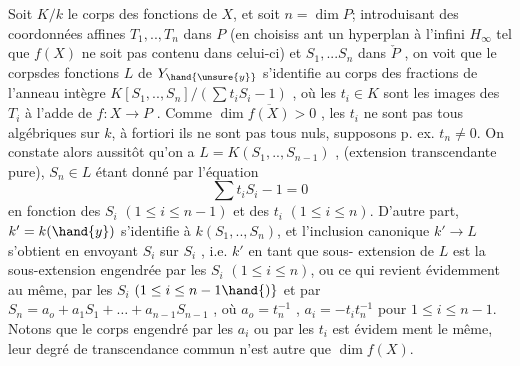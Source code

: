 
 Soit $K/k$ le corps des fonctions de $X$, et soit $n=\dim P$;
introduisant des coordonnées  affines $T_1,..,T_n$ dans $P$ (en choisiss
ant un hyperplan à l'infini $H_\infty$ tel que $f(X)$ ne soit pas contenu dans
celui-ci) et $S_1,...S_n$ dans $\check{P}$ , on voit que le corpsdes fonctions $L$
de $Y_{\hand{\unsure{y}}}$  s'identifie au corps des fractions de l'anneau intègre
$K[S_1,..,S_n]/(\sum t_iS_i - 1)$ , où les $t_i \in K$ sont les images des $T_i$ à
l'adde de $f:X\to P$ . Comme $\dim \overline{f(X)} > 0$ , les $t_i$ ne sont pas tous
algébriques sur $k$, à fortiori ils ne sont pas tous nuls, supposons
p. ex. $t_n \neq 0$. On constate alors aussitôt qu'on a $L = K(S_1,..,S_{n-1})$ ,
(extension transcendante pure), $S_n\in L$ étant donné par l'équation
\[ \sum t_iS_i - 1 = 0 \]
en fonction des $S_i$ $(1\leq i\leq n-1)$ et des $t_i$ $(1\leq i\leq n)$. D'autre part,
$k' = k(\hand{y})$ s'identifie à $k(S_1,..,S_n)$, et l'inclusion canonique
$k'\longrightarrow L$ s'obtient en envoyant $S_i$ sur $S_i$ , i.e. $k'$ en tant que sous-%
extension de $L$ est la sous-extension engendrée par les $S_i$ $(1\leq i\leq n)$, ou
ce qui revient évidemment au même, par les $S_i$ $(1\leq i\leq n-1\hand{)}$ et par
$S_n = a_o + a_1S_1 + \ldots + a_{n-1}S_{n-1}$ , où $a_o = t_n^{-1}$ , $a_i =-t_it_n^{-1}$ pour
$1\leq i\leq n-1$. Notons que le corps engendré par les $a_i$ ou par les $t_i$ est évidem
ment le même, leur degré de transcendance commun
n'est autre que $\dim f(X)$.

